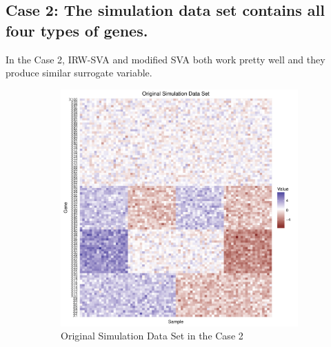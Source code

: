 \documentclass[11pt]{article}
\begin{document}
\newpage

\subsection{Case 2: The simulation data set contains all four types of genes.}

In the Case 2, IRW-SVA and modified SVA both work pretty well and they produce similar surrogate variable.

\begin{figure}[h!]
    \centering
    \begin{subfigure}[b]{0.3\textwidth}
        \centering
        \includegraphics[width = \textwidth]{figures/simulate0.pdf}
        \caption{Original Simulation Data Set in the Case 2}
    \end{subfigure}%
~
    \begin{subfigure}[b]{0.3\textwidth}
        \centering

\end{subfigure}
\end{figure}
\end{document}
